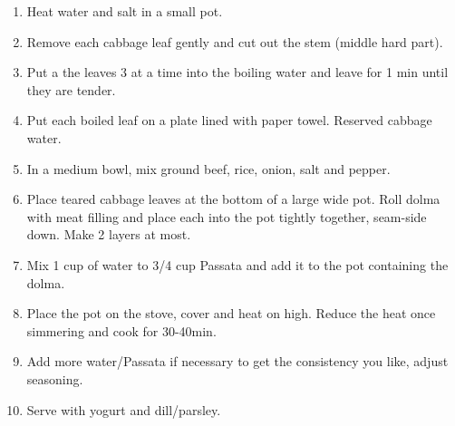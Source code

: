 \begin{enumerate}
    \item Heat water and salt in a small pot.
    \item Remove each cabbage leaf gently and cut out the stem (middle hard part).
    \item Put a the leaves 3 at a time into the boiling water and leave for 1 min until they are tender.
    \item Put each boiled leaf on a plate lined with paper towel. Reserved cabbage water.
    \item In a medium bowl, mix ground beef, rice, onion, salt and pepper.
    \item Place teared cabbage leaves at the bottom of a large wide pot. Roll dolma with meat filling and place each into the pot tightly together, seam-side down. Make 2 layers at most.
    \item Mix 1 cup of water to 3/4 cup Passata and add it to the pot containing the dolma.
    \item Place the pot on the stove, cover and heat on high. Reduce the heat once simmering and cook for 30-40min.
    \item Add more water/Passata if necessary to get the consistency you like, adjust seasoning.
    \item Serve with yogurt and dill/parsley.
\end{enumerate}

